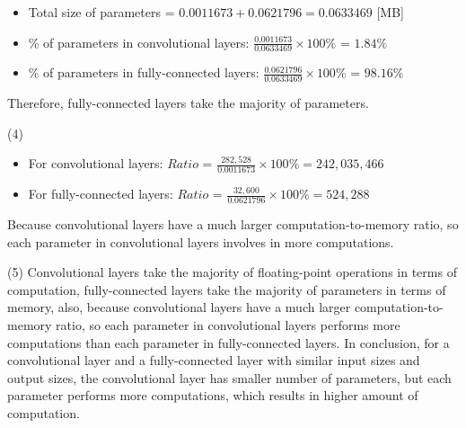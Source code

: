 \documentclass[11pt]{article}
\begin{document}
\begin{solution}
\begin{itemize}
\item Total size of parameters = $0.0011673 + 0.0621796 = 0.0633469$ [MB]
\item \% of parameters in convolutional layers: $\frac{0.0011673}{0.0633469} \times 100\%$ = $1.84\%$
\item \% of parameters in fully-connected layers: $\frac{0.0621796}{0.0633469} \times 100\%$ = $98.16\%$
\end{itemize}
Therefore, fully-connected layers take the majority of parameters.
\item(4) 
\begin{itemize}
\item For convolutional layers: $Ratio$ = $\frac{282,528}{0.0011673} \times 100\% = 242,035,466$
\item For fully-connected layers: $Ratio$ = $\frac{32,600}{0.0621796} \times 100\% = 524,288$
\end{itemize}
Because convolutional layers have a much larger computation-to-memory ratio, so each parameter in convolutional layers involves in more computations.
\item (5) Convolutional layers take the majority of floating-point operations in terms of computation, fully-connected layers take the majority of parameters in terms of memory, also, because convolutional layers have a much larger computation-to-memory ratio, so each parameter in convolutional layers performs more computations than each parameter in fully-connected layers. In conclusion, for a convolutional layer and a fully-connected layer with similar input sizes and output sizes, the convolutional layer has smaller number of parameters, but each parameter performs more computations, which results in higher amount of computation.
\end{solution}
\setcounter{page}{5}
\end{document}
